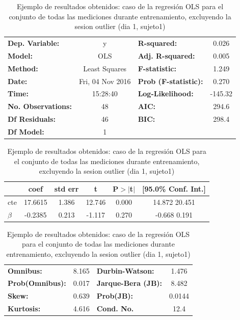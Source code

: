 \documentclass{article}
\begin{document}
\begin {table}

\begin{center}

\caption{Ejemplo de resultados obtenidos: caso de la regresión OLS para el conjunto de todas las mediciones durante entrenamiento, excluyendo la sesion outlier (dia 1, sujeto1)}
\label{tabla:entrenamientoGlobal}

\vspace{0.3in}

\begin{tabular}{lclc}
\toprule
\textbf{Dep. Variable:}    &        y         & \textbf{  R-squared:         } &     0.026   \\
\textbf{Model:}            &       OLS        & \textbf{  Adj. R-squared:    } &     0.005   \\
\textbf{Method:}           &  Least Squares   & \textbf{  F-statistic:       } &     1.249   \\
\textbf{Date:}             & Fri, 04 Nov 2016 & \textbf{  Prob (F-statistic):} &    0.270    \\
\textbf{Time:}             &     15:28:40     & \textbf{  Log-Likelihood:    } &   -145.32   \\
\textbf{No. Observations:} &          48      & \textbf{  AIC:               } &     294.6   \\
\textbf{Df Residuals:}     &          46      & \textbf{  BIC:               } &     298.4   \\
\textbf{Df Model:}         &           1      & \textbf{                     } &             \\
\bottomrule
\end{tabular}

\begin{tabular}{lccccc}
               & \textbf{coef} & \textbf{std err} & \textbf{t} & \textbf{P$>|$t$|$} & \textbf{[95.0\% Conf. Int.]}  \\
\midrule
cte &      17.6615  &        1.386     &    12.746  &         0.000        &        14.872    20.451       \\
$\beta$    &      -0.2385  &        0.213     &    -1.117  &         0.270        &        -0.668     0.191       \\
\bottomrule
\end{tabular}

\begin{tabular}{lclc}
\textbf{Omnibus:}       &  8.165 & \textbf{  Durbin-Watson:     } &    1.476  \\
\textbf{Prob(Omnibus):} &  0.017 & \textbf{  Jarque-Bera (JB):  } &    8.482  \\
\textbf{Skew:}          &  0.639 & \textbf{  Prob(JB):          } &   0.0144  \\
\textbf{Kurtosis:}      &  4.616 & \textbf{  Cond. No.          } &     12.4  \\
\bottomrule
\end{tabular}

\end{center}

\end{table}
\end{document}
